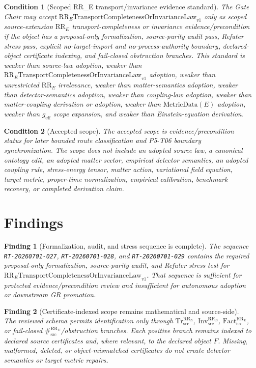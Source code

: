 \documentclass[11pt]{article}
\newcommand{\RRE}{\mathrm{RR}_{E}}
\newcommand{\TrRR}{\mathrm{Tr}^{\RRE}_{\mathrm{src}}}
\newcommand{\InvRR}{\mathrm{Inv}^{\RRE}_{\mathrm{src}}}
\newcommand{\FactRR}{\mathrm{Fact}^{\RRE}_{\mathrm{src}}}
\newcommand{\SepRR}{\#^{\RRE}_{\mathrm{src}}}
\newcommand{\LawRR}{\mathrm{RR}_{E}\mathrm{TransportCompletenessOrInvarianceLaw}_{v1}}
\newcommand{\MetricData}{\mathrm{MetricData}}
\newcommand{\geff}{g_{\mathrm{eff}}}
\newtheorem{finding}{Finding}
\newtheorem{condition}{Condition}
\begin{document}
\begin{condition}[Scoped RR\_E transport/invariance evidence standard]
The Gate Chair may accept \(\LawRR\) only as scoped source-extension
\(\RRE\) transport-completeness or invariance evidence/precondition if the
object has a proposal-only formalization, source-purity audit pass, Refuter
stress pass, explicit no-target-import and no-process-authority boundary,
declared-object certificate indexing, and fail-closed obstruction branches.
This standard is weaker than source-law adoption, weaker than \(\LawRR\)
adoption, weaker than unrestricted \(\RRE\) irrelevance, weaker than
matter-semantics adoption, weaker than detector-semantics adoption, weaker
than coupling-law adoption, weaker than matter-coupling derivation or
adoption, weaker than \(\MetricData(E)\) adoption, weaker than \(\geff\)
scope expansion, and weaker than Einstein-equation derivation.
\end{condition}

\begin{condition}[Accepted scope]
The accepted scope is evidence/precondition status for later bounded route
classification and P5-T06 boundary synchronization. The scope does not include
an adopted source law, a canonical ontology edit, an adopted matter sector,
empirical detector semantics, an adopted coupling rule, stress-energy tensor,
matter action, variational field equation, target metric, proper-time
normalization, empirical calibration, benchmark recovery, or completed
derivation claim.
\end{condition}

\section{Findings}

\begin{finding}[Formalization, audit, and stress sequence is complete]
The sequence \texttt{RT-20260701-027}, \texttt{RT-20260701-028}, and
\texttt{RT-20260701-029} contains the required proposal-only formalization,
source-purity audit, and Refuter stress test for \(\LawRR\). That sequence is
sufficient for protected evidence/precondition review and insufficient for
autonomous adoption or downstream GR promotion.
\end{finding}

\begin{finding}[Certificate-indexed scope remains mathematical and source-side]
The reviewed schema permits identification only through \(\TrRR\),
\(\InvRR\), \(\FactRR\), or fail-closed \(\SepRR\)/obstruction branches. Each
positive branch remains indexed to declared source certificates and, where
relevant, to the declared object \(F\). Missing, malformed, deleted, or
object-mismatched certificates do not create detector semantics or target
metric repairs.
\end{finding}
\end{document}
